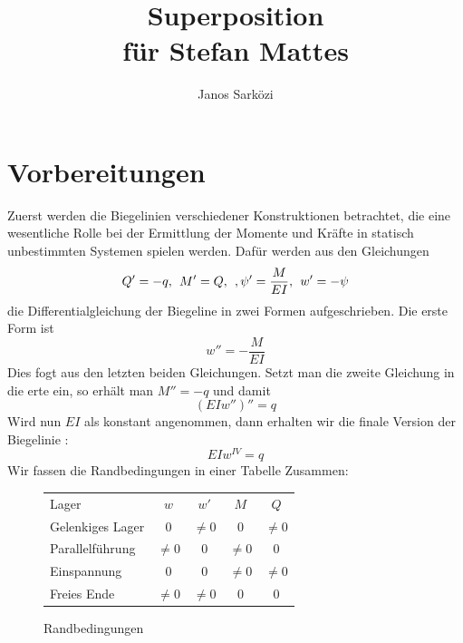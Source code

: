 \documentclass[fleqn]{scrartcl}
\title{Superposition \\
für Stefan Mattes}
\author{Janos Sarközi}
\numberwithin{equation}{section}
\begin{document}
\maketitle
\newpage
\section{Vorbereitungen}
Zuerst werden die Biegelinien verschiedener Konstruktionen betrachtet, die eine wesentliche Rolle bei der Ermittlung der Momente und Kräfte in statisch unbestimmten Systemen spielen werden. Dafür werden aus den Gleichungen
\[
    Q'=-q,\hspace{1ex}M'=Q,\hspace{1ex},\psi'=\frac{M}{EI},\hspace{1ex}w'=-\psi
\]
die Differentialgleichung der Biegeline in zwei Formen aufgeschrieben. Die erste Form ist
\[
    w''=-\frac{M}{EI}
\]
Dies fogt aus den letzten beiden Gleichungen. Setzt man die zweite Gleichung in die erte ein, so erhält man $M''=-q$ und damit
\[
    (EIw'')''=q
\]
Wird nun $EI$ als konstant angenommen, dann erhalten wir die finale Version der Biegelinie
:
\[
    EIw^{IV}=q
\]
Wir fassen die Randbedingungen in einer Tabelle Zusammen:
\begin{figure}[h]
\centering
\begin{tabular}[h]{lcccc}
    Lager            & $w$      & $w'$     & $M$      & $Q$ \\
    Gelenkiges Lager & $0$      & $\neq 0$ & $0$      & $\neq 0$ \\
    Parallelführung  & $\neq 0$ & $0$      & $\neq 0$ & $0$ \\
    Einspannung      & $0$      & $0$      & $\neq 0$ & $\neq 0$ \\
    Freies Ende      & $\neq 0$ & $\neq 0$ & $0$      & $0$ \\
\end{tabular}
\caption{Randbedingungen}
\label{fig:randbedingungen}
\end{figure}
\end{document}
